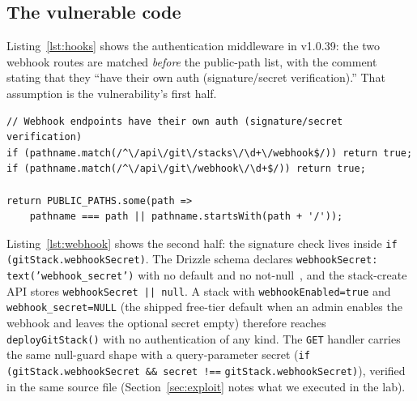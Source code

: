 \documentclass[journal]{IEEEtran}
\begin{document}
\subsection{The vulnerable code}

Listing~\ref{lst:hooks} shows the authentication middleware in v1.0.39: the
two webhook routes are matched \emph{before} the public-path list, with the
comment stating that they ``have their own auth (signature/secret
verification).'' That assumption is the vulnerability's first half.

\begin{lstlisting}[style=ts,label={lst:hooks},
caption={v1.0.39 \texttt{src/hooks.server.ts}: the webhook routes are exempt
from session auth because signature verification is assumed to cover them
(source, upstream repository~\cite{vendorrepo})}]
// Webhook endpoints have their own auth (signature/secret verification)
if (pathname.match(/^\/api\/git\/stacks\/\d+\/webhook$/)) return true;
if (pathname.match(/^\/api\/git\/webhook\/\d+$/)) return true;

return PUBLIC_PATHS.some(path =>
    pathname === path || pathname.startsWith(path + '/'));
\end{lstlisting}

Listing~\ref{lst:webhook} shows the second half: the signature check lives
inside \texttt{if (gitStack.webhookSecret)}. The Drizzle schema declares
\texttt{webhookSecret: text('webhook\_secret')} with no default and no
not-null~\cite{vendorrepo}, and the stack-create API stores
\texttt{webhookSecret || null}. A stack with \texttt{webhookEnabled=true} and
\texttt{webhook\_secret=NULL} (the shipped free-tier default when an admin
enables the webhook and leaves the optional secret empty) therefore reaches
\texttt{deployGitStack()} with no authentication of any kind. The
\texttt{GET} handler carries the same null-guard shape with a query-parameter
secret (\texttt{if (gitStack.webhookSecret \&\& secret !==}
\texttt{gitStack.webhookSecret)}), verified in the same source file
(Section~\ref{sec:exploit} notes what we executed in the lab).
\end{document}
